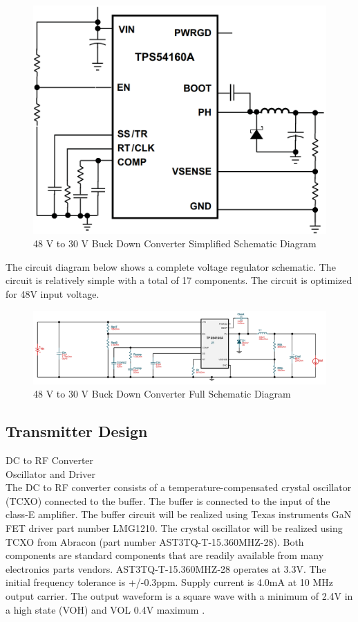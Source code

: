 \documentclass[12pt]{article}
\begin{document}
\begin{figure}[h!]
\centering
\includegraphics[width=0.65\linewidth]{TPS54160_ex}
\caption{48 V to 30 V Buck Down Converter Simplified Schematic Diagram \cite{TPS54160}}
\end{figure}

\noindent
The circuit diagram below shows a complete voltage regulator schematic. The circuit is relatively simple with a total of 17 components. The circuit is optimized for 48V input voltage. 

\begin{figure}[h!]
\centering
\includegraphics[width=1\linewidth]{48V_schem}
\caption{48 V to 30 V Buck Down Converter Full Schematic Diagram}
\end{figure}

\pagebreak


\subsection{Transmitter Design}
DC to RF Converter\\
Oscillator and Driver\\

\indent
The DC to RF converter consists of a temperature-compensated crystal oscillator (TCXO) connected to the buffer. The buffer is connected to the input of the class-E amplifier. The buffer circuit will be realized using  Texas instruments GaN FET driver part number LMG1210. The crystal oscillator will be realized using TCXO from Abracon (part number AST3TQ-T-15.360MHZ-28). Both components are standard components that are readily available from many electronics parts vendors. AST3TQ-T-15.360MHZ-28 operates at 3.3V. The initial frequency tolerance is +/-0.3ppm. Supply current is 4.0mA at 10 MHz output carrier. The output waveform is a square wave with a minimum of 2.4V in a high state (VOH) and VOL 0.4V maximum \cite{AST3TQ28}. \\
\end{document}
